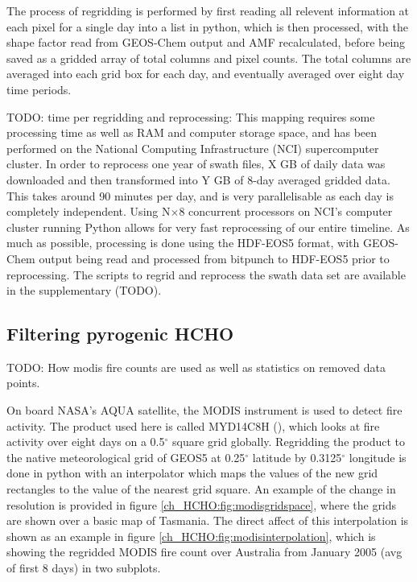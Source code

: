     The process of regridding is performed by first reading all relevent information at each pixel for a single day into a list in python, which is then processed, with the shape factor read from GEOS-Chem output and AMF recalculated, before being saved as a gridded array of total columns and pixel counts.
    The total columns are averaged into each grid box for each day, and eventually averaged over eight day time periods.
    
    TODO: time per regridding and reprocessing:
    This mapping requires some processing time as well as RAM and computer storage space, and has been performed on the National Computing Infrastructure (NCI) supercomputer cluster.
    In order to reprocess one year of swath files, X GB of daily data was downloaded and then transformed into Y GB of 8-day averaged gridded data.
    This takes around 90 minutes per day, and is very parallelisable as each day is completely independent.
    Using N$\times 8$ concurrent processors on NCI's computer cluster running Python allows for very fast reprocessing of our entire timeline.
    As much as possible, processing is done using the HDF-EOS5 format, with GEOS-Chem output being read and processed from bitpunch to HDF-EOS5 prior to reprocessing.
    The scripts to regrid and reprocess the swath data set are available in the supplementary (TODO).
    
  \subsection{Filtering pyrogenic HCHO}
  \label{ch_HCHO:sec:filteringfires}
    TODO: How modis fire counts are used as well as statistics on removed data points.
    
    On board NASA's AQUA satellite, the MODIS instrument is used to detect fire activity.
    The product used here is called MYD14C8H (\citep{Giglio2006}), which looks at fire activity over eight days on a 0.5$^{\circ}$ square grid globally.
    Regridding the product to the native meteorological grid of GEOS5 at 0.25$^{\circ}$ latitude by 0.3125$^{\circ}$ longitude is done in python with an interpolator which maps the values of the new grid rectangles to the value of the nearest grid square.
    An example of the change in resolution is provided in figure \ref{ch_HCHO:fig:modisgridspace}, where the grids are shown over a basic map of Tasmania.
    The direct affect of this interpolation is shown as an example in figure \ref{ch_HCHO:fig:modisinterpolation}, which is showing the regridded MODIS fire count over Australia from January 2005 (avg of first 8 days) in two subplots.
    
